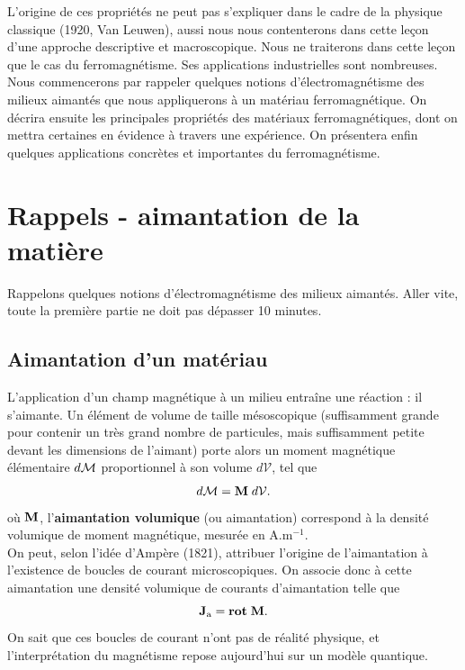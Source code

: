 \documentclass[11pt,a4paper]{report}
\begin{document}
L'origine de ces propriétés ne peut pas s'expliquer dans le cadre de la physique classique (1920, Van Leuwen), aussi nous nous contenterons dans cette leçon d'une approche descriptive et macroscopique. Nous ne traiterons dans cette leçon que le cas du ferromagnétisme. Ses applications industrielles sont nombreuses. Nous commencerons par rappeler quelques notions d'électromagnétisme des milieux aimantés que nous appliquerons à un matériau ferromagnétique. On décrira ensuite les principales propriétés des matériaux ferromagnétiques, dont on mettra certaines en évidence à travers une expérience. On présentera enfin quelques applications concrètes et importantes du ferromagnétisme.

\newpage
\section{Rappels - aimantation de la matière}

Rappelons quelques notions d'électromagnétisme des milieux aimantés. Aller vite, toute la première partie ne doit pas dépasser 10 minutes.

\subsection{Aimantation d'un matériau}

L'application d'un champ magnétique à un milieu entraîne une réaction : il s'aimante. Un élément de volume de taille mésoscopique (suffisamment grande pour contenir un très grand nombre de particules, mais suffisamment petite devant les dimensions de l'aimant) porte alors un moment magnétique élémentaire $d\bold{\mathcal{M}}$ proportionnel à son volume $d\mathcal{V}$, tel que
\begin{equation}
	d\bold{\mathcal{M}} = \bold{M} \; d\mathcal{V}.
\end{equation}
où $\bold{M}$, l'\textbf{aimantation volumique} (ou aimantation) correspond à la densité volumique de moment magnétique, mesurée en $\text{A}.\text{m}^{-1}$.\\

On peut, selon l'idée d'Ampère (1821), attribuer l'origine de l'aimantation à l'existence de boucles de courant microscopiques. On associe donc à cette aimantation une densité volumique de courants d'aimantation telle que
\begin{equation}
	\bold{J}_\text{a} = \textbf{rot}\;\bold{M}.
\end{equation}
On sait que ces boucles de courant n'ont pas de réalité physique, et l'interprétation du magnétisme repose aujourd'hui sur un modèle quantique.\\
\end{document}
